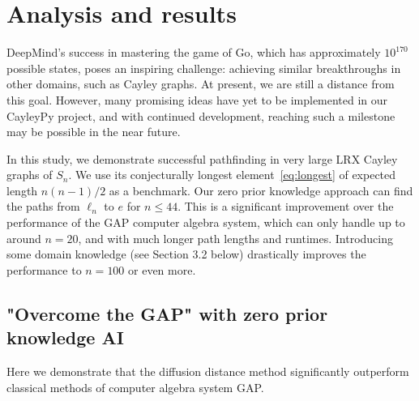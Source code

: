 \documentclass[reqno,11pt]{amsart}
\begin{document}
\section{Analysis and results}

DeepMind's success in mastering the game of Go, which has approximately $10^{170}$ possible states, poses an inspiring challenge: achieving similar breakthroughs in other domains, such as Cayley graphs. At present, we are still a distance from this goal. However, many promising ideas have yet to be implemented in our CayleyPy project, and with continued development, reaching such a milestone may be possible in the near future.

In this study, we demonstrate successful pathfinding in very large LRX Cayley graphs of $S_n$. We use its conjecturally longest element~\eqref{eq:longest} of expected length $n(n-1)/2$ as a benchmark.  Our zero prior knowledge approach can find the paths from $\ell_n$ to $e$ for $n \leqslant 44$. This is a significant improvement over the performance of the GAP computer algebra system, which can only handle up to around $n=20$, and with much longer path lengths and runtimes.  Introducing some domain knowledge (see Section 3.2 below) drastically improves the performance to $n=100$ or even more.


\subsection{"Overcome the GAP" with zero prior knowledge AI }
Here we demonstrate that the diffusion distance method significantly outperform classical methods of computer algebra system GAP. 
\end{document}
